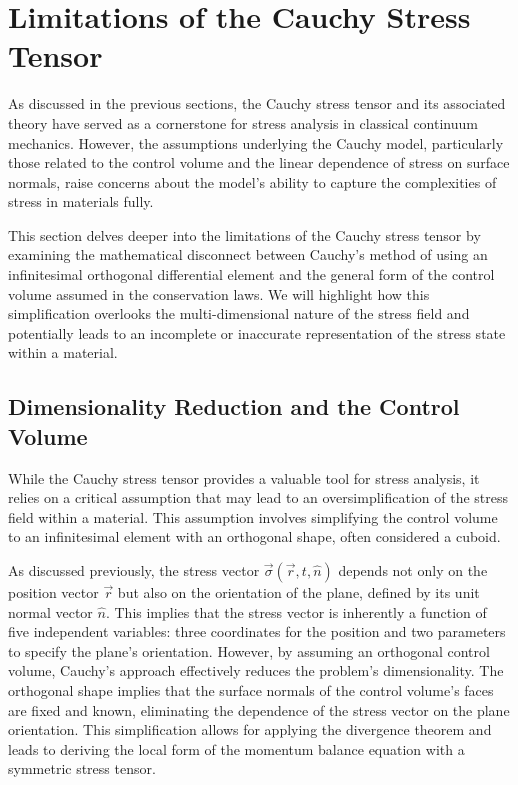 \documentclass[12pt,a4paper,english]{article}
\begin{document}

\section{Limitations of the Cauchy Stress Tensor}

As discussed in the previous sections, the Cauchy stress tensor and its associated theory have served as a cornerstone for stress analysis in classical continuum mechanics. However, the assumptions underlying the Cauchy model, particularly those related to the control volume and the linear dependence of stress on surface normals, raise concerns about the model's ability to capture the complexities of stress in materials fully.

This section delves deeper into the limitations of the Cauchy stress tensor by examining the mathematical disconnect between Cauchy's method of using an infinitesimal orthogonal differential element and the general form of the control volume assumed in the conservation laws. We will highlight how this simplification overlooks the multi-dimensional nature of the stress field and potentially leads to an incomplete or inaccurate representation of the stress state within a material.

\subsection{Dimensionality Reduction and the Control Volume}

While the Cauchy stress tensor provides a valuable tool for stress analysis, it relies on a critical assumption that may lead to an oversimplification of the stress field within a material. This assumption involves simplifying the control volume to an infinitesimal element with an orthogonal shape, often considered a cuboid.

As discussed previously, the stress vector $\vec{\sigma}(\vec{r}, t, \hat{n})$ depends not only on the position vector $\vec{r}$ but also on the orientation of the plane, defined by its unit normal vector $\hat{n}$. This implies that the stress vector is inherently a function of five independent variables: three coordinates for the position and two parameters to specify the plane's orientation. However, by assuming an orthogonal control volume, Cauchy's approach effectively reduces the problem's dimensionality. The orthogonal shape implies that the surface normals of the control volume's faces are fixed and known, eliminating the dependence of the stress vector on the plane orientation. This simplification allows for applying the divergence theorem and leads to deriving the local form of the momentum balance equation with a symmetric stress tensor.
\end{document}
